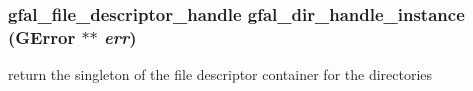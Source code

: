 \subsubsection{\setlength{\rightskip}{0pt plus 5cm}gfal\_\-file\_\-descriptor\_\-handle gfal\_\-dir\_\-handle\_\-instance (GError $\ast$$\ast$ {\em err})}\label{gfal__common__dir__handle_8c_c6a3e1ddffb475e5855442c9a0573bfc}


return the singleton of the file descriptor container for the directories 